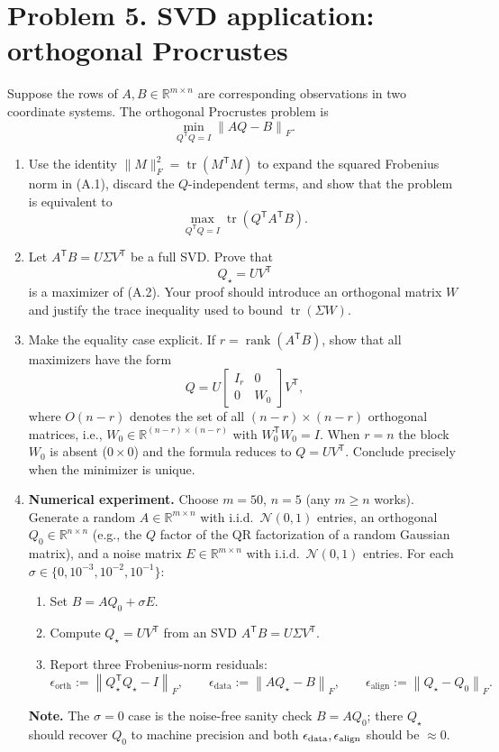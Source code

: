 \documentclass[11pt]{article}
\newcommand{\R}{\mathbb{R}}
\newcommand{\norm}[1]{\left\lVert #1\right\rVert}
\newcommand{\T}{^{\mathsf T}}
\newcommand{\tr}{\operatorname{tr}}
\newcommand{\rank}{\operatorname{rank}}
\begin{document}
\section*{Problem 5. SVD application: orthogonal Procrustes}

Suppose the rows of $A,B\in\R^{m\times n}$ are corresponding observations in two coordinate
systems. The orthogonal Procrustes problem is
\[
  \min_{Q\T Q=I}\norm{AQ-B}_F. \tag{A.1}
\]

\begin{enumerate}[label=\textbf{A\arabic*.}]
\item Use the identity $\|M\|_F^2=\tr(M\T M)$ to expand the squared Frobenius norm
in (A.1), discard the $Q$-independent terms, and show that the problem is equivalent to
\[
   \max_{Q\T Q=I}\operatorname{tr}(Q\T A\T B). \tag{A.2}
\]
\item Let $A\T B=U\Sigma V\T$ be a full SVD. Prove that
\[
Q_\star=UV\T \tag{A.3}
\]
is a maximizer of (A.2). Your proof should introduce an orthogonal matrix $W$ and justify
the trace inequality used to bound $\operatorname{tr}(\Sigma W)$.
\item Make the equality case explicit. If $r=\rank(A\T B)$, show that all maximizers have the
form
\[
 Q=U\begin{bmatrix}I_r&0\\0&W_0\end{bmatrix}V\T, \tag{A.4}
\]
where $O(n-r)$ denotes the set of all $(n-r)\times(n-r)$ orthogonal matrices, i.e.,
$W_0\in\R^{(n-r)\times(n-r)}$ with $W_0\T W_0=I$. When $r=n$ the block $W_0$ is absent
($0\times 0$) and the formula reduces to $Q=UV\T$. Conclude precisely when the minimizer
is unique.
\item \textbf{Numerical experiment.} Choose $m=50$, $n=5$ (any $m\ge n$ works).
Generate a random $A\in\R^{m\times n}$ with i.i.d.\ $\mathcal{N}(0,1)$ entries,
an orthogonal $Q_0\in\R^{n\times n}$ (e.g., the $Q$ factor of the QR factorization
of a random Gaussian matrix), and a noise matrix $E\in\R^{m\times n}$ with i.i.d.\
$\mathcal{N}(0,1)$ entries. For each $\sigma\in\{0,10^{-3},10^{-2},10^{-1}\}$:
\begin{enumerate}[label=(\alph*)]
\item Set $B=AQ_0+\sigma E$.
\item Compute $Q_\star = UV\T$ from an SVD $A\T B = U\Sigma V\T$.
\item Report three Frobenius-norm residuals:
\[
\epsilon_{\mathrm{orth}}:=\norm{Q_\star\T Q_\star-I}_F,\qquad
\epsilon_{\mathrm{data}}:=\norm{AQ_\star-B}_F,\qquad
\epsilon_{\mathrm{align}}:=\norm{Q_\star-Q_0}_F.
\]
\end{enumerate}
\textbf{Note.} The $\sigma=0$ case is the noise-free sanity check $B=AQ_0$; there
$Q_\star$ should recover $Q_0$ to machine precision and both
$\epsilon_{\rm data},\epsilon_{\rm align}$ should be $\approx 0$.
\end{enumerate}
\end{document}
